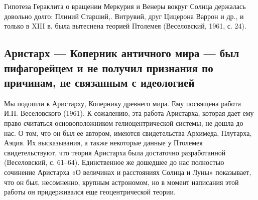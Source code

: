 Гипотеза  Гераклита  о  вращении   Меркурия  и  Венеры  вокруг  Солнца
держалась  довольно долго:  Плиний Старший,.  Витрувий, друг  Цицерона
Варрон  и др.,  и только  в XIII  в. была  вытеснена теорией  Птолемея
(Веселовский, 1961, с. 24).

\subsection{Аристарх --- Коперник античного  мира --- был пифагорейцем
и не получил признания по причинам, не связанным с идеологией}

Мы подошли к Аристарху, Копернику  древнего мира. Ему посвящена работа
И.Н. Веселовского  (1961). К сожалению, эта  работа Аристарха, которая
дает ему  право считаться основоположником  гелиоцентрической системы,
не дошла до  нас. О том, что он был  ее автором, имеются свидетельства
Архимеда, Плутарха,  Аэция. Их высказывания, а  также некоторые данные
у  Птолемея  свидетельствуют,  что теория  Аристарха  была  достаточно
разработанной (Веселовский,  с. 61--64).  Единственное же  дошедшее до
нас полностью сочинение Аристарха «О  величинах и расстояниях Солнца и
Луны» показывает,  что он  был, несомненно,  крупным астрономом,  но в
момент  написания этой  работы  он  придерживался еще  геоцентрической
теории.

